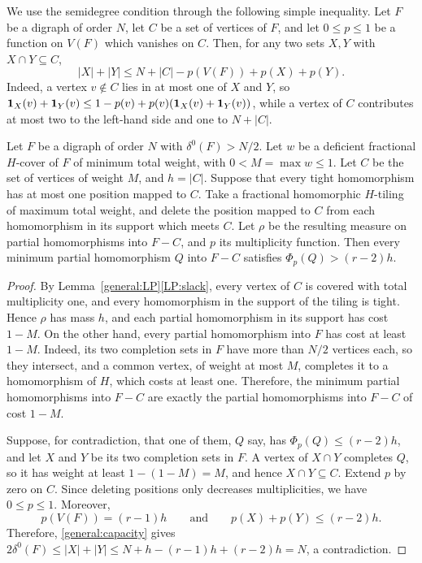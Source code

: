 We use the semidegree condition through the following simple inequality. Let $F$ be a digraph of order $N$, let $C$ be a set of vertices of $F$, and let $0\le p\le1$ be a function on $V(F)$ which vanishes on $C$. Then, for any two sets $X,Y$ with $X\cap Y\subseteq C$,
\begin{equation}\label{general:capacity}
 |X|+|Y|\le N+|C|-p(V(F))+p(X)+p(Y).
\end{equation}
Indeed, a vertex $v\notin C$ lies in at most one of $X$ and $Y$, so $\mathbf 1_X(v)+\mathbf 1_Y(v)\le1-p(v)+p(v)(\mathbf 1_X(v)+\mathbf 1_Y(v))$, while a vertex of $C$ contributes at most two to the left-hand side and one to $N+|C|$.

\begin{lemma}\label{general:max-deletion}
Let $F$ be a digraph of order $N$ with $\delta^0(F)>N/2$. Let $w$ be a deficient fractional $H$-cover of $F$ of minimum total weight, with $0<M=\max w\le1$. Let $C$ be the set of vertices of weight $M$, and $h=|C|$.
Suppose that every tight homomorphism has at most one position mapped to $C$.
Take a fractional homomorphic $H$-tiling of maximum total weight, and delete the position mapped to $C$ from each homomorphism in its support which meets $C$. Let $\rho$ be the resulting measure on partial homomorphisms into $F-C$, and $p$ its multiplicity function.
Then every minimum partial homomorphism $Q$ into $F-C$ satisfies $\Phi_p(Q)>(r-2)h$.
\end{lemma}
\begin{proof}
By Lemma~\ref{general:LP}\ref{LP:slack}, every vertex of $C$ is covered with total multiplicity one, and every homomorphism in the support of the tiling is tight.
Hence $\rho$ has mass $h$, and each partial homomorphism in its support has cost $1-M$.
On the other hand, every partial homomorphism into $F$ has cost at least $1-M$. Indeed, its two completion sets
in $F$ have more than $N/2$ vertices each, so they intersect, and a common vertex, of weight at most $M$, completes it to a homomorphism of $H$, which costs at least one. Therefore, the minimum partial homomorphisms into $F-C$ are exactly the partial homomorphisms into $F-C$ of cost $1-M$.

Suppose, for contradiction, that one of them, $Q$ say, has $\Phi_p(Q)\le(r-2)h$, and let $X$ and $Y$ be its two completion sets in $F$. A vertex of $X\cap Y$ completes $Q$, so it has weight at least $1-(1-M)=M$, and hence
$X\cap Y\subseteq C$.
Extend $p$ by zero on $C$. Since deleting positions only
decreases multiplicities, we have $0\le p\le1$. Moreover,
\[
 p(V(F))=(r-1)h\qquad\text{and}\qquad p(X)+p(Y)\le(r-2)h.
\]
Therefore, \eqref{general:capacity} gives
$2\delta^0(F)\le|X|+|Y|\le N+h-(r-1)h+(r-2)h=N$, a contradiction.
\end{proof}

